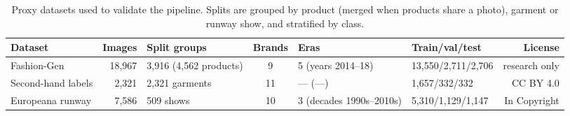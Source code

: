 \begin{table}[t]\centering\footnotesize
\caption{Proxy datasets used to validate the pipeline. Splits are grouped by product (merged when products share a photo), garment or runway show, and stratified by class.}\label{tab:datasets}
\begin{tabular}{lrlcllr}\toprule
Dataset & Images & Split groups & Brands & Eras & Train/val/test & License \\\midrule
Fashion-Gen & 18,967 & 3,916 (4,562 products) & 9 & 5 (years 2014--18) & 13,550/2,711/2,706 & research only \\
Second-hand labels & 2,321 & 2,321 garments & 11 & --- (---) & 1,657/332/332 & CC BY 4.0 \\
Europeana runway & 7,586 & 509 shows & 10 & 3 (decades 1990s--2010s) & 5,310/1,129/1,147 & In Copyright \\
\bottomrule\end{tabular}\end{table}
